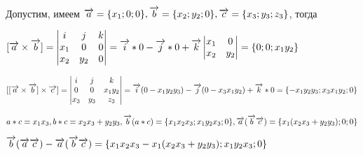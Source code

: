 \documentclass{article}
\def\vec{\ensuremath\overrightarrow}
\begin{document}
\begin{flushleft}
Допустим, имеем $\vec{a} = \{ x_1; 0; 0 \}, \vec{b} = \{ x_2; y_2; 0 \}, \vec{c} = \{ x_3; y_3; z_3 \}$, тогда

$[ \vec{a} \times \vec{b} ] = \begin{vmatrix}
    i & j & k \\
    x_1 & 0 & 0 \\
    x_2 & y_2 & 0
\end{vmatrix} = \vec{i} * 0 - \vec{j} * 0 + \vec{k} \begin{vmatrix}
    x_1 & 0 \\
    x_2 & y_2
\end{vmatrix} = \{ 0; 0; x_1 y_2 \}$

$[ [ \vec{a} \times \vec{b} ] \times \vec{c} ] = \begin{vmatrix}
    i & j & k \\
    0 & 0 & x_1 y_2 \\
    x_3 & y_3 & z_3
\end{vmatrix} = \vec{i} (0 - x_1 y_2 y_3) - \vec{j} (0 - x_3 x_1 y_2 ) + \vec{k} * 0 = \{ -x_1 y_2 y_3; x_3 x_1 y_2; 0 \}$

$a * c = x_1 x_3, b * c = x_2 x_3 + y_2 y_3, \vec{b} (a * c) = \{x_1 x_2 x_3; x_1 y_2 x_3; 0 \}, \vec{a} (\vec{b} \vec{c}) = \{ x_1 (x_2 x_3 + y_2 y_3); 0; 0 \}$

$\vec{b} (\vec{a} \vec{c}) - \vec{a} (\vec{b} \vec{c}) = \{ x_1 x_2 x_3 - x_1 (x_2 x_3 + y_2 y_3); x_1 y_2 x_3; 0 \}$

\end{flushleft}
\end{document}
